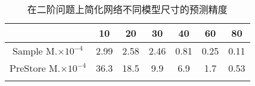 \begin{center}
\begin{table}
	\caption{在二阶问题上简化网络不同模型尺寸的预测精度}
	\renewcommand\arraystretch{1.2}
	\setlength{\tabcolsep}{12pt}
	\begin{tabular}{ccccccc}
	\toprule
		 							&	10		&	20		&	30		&	40		&	60		&	80		\\	\midrule
	Sample M.\(\times 10^{-4}\)	&	2.99	&	2.58	&	2.46	&	0.81	&	0.25	&	0.11	 \\	\hline
	PreStore M.\(\times 10^{-4}\)&	36.3	&	18.5	&	9.9		&	6.9		&	1.7		&	0.53	\\	
	\bottomrule
	\label{tab:second}
	\end{tabular}
\end{table}
\vspace{-3em}
\end{center}

